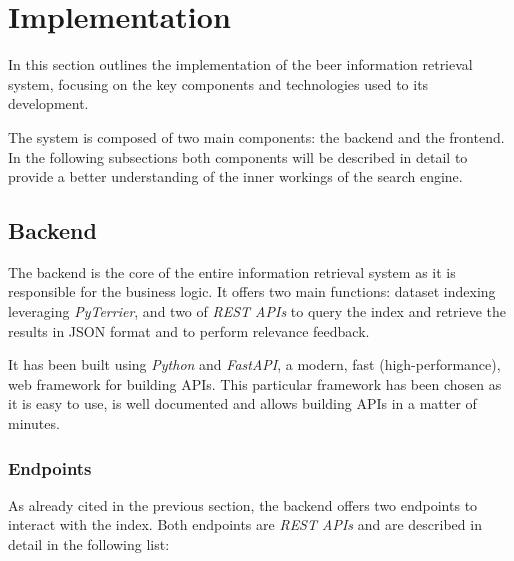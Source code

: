 \section{Implementation}

In this section outlines the implementation of the beer information retrieval system, focusing on the key components and technologies used to its development.

The system is composed of two main components: the backend and the frontend. In the following subsections both components will be described in detail to provide a better understanding of the inner workings of the search engine.

\subsection{Backend}

The backend is the core of the entire information retrieval system as it is responsible for the business logic. It offers two main functions: dataset indexing leveraging \textit{PyTerrier}, and two of \textit{REST APIs} to query the index and retrieve the results in JSON format and to perform relevance feedback.

It has been built using \textit{Python} and \textit{FastAPI}, a modern, fast (high-performance), web framework for building APIs. This particular framework has been chosen as it is easy to use, is well documented and allows building APIs in a matter of minutes.

\subsubsection{Endpoints}

As already cited in the previous section, the backend offers two endpoints to interact with the index. Both endpoints are \textit{REST APIs} and are described in detail in the following list:

